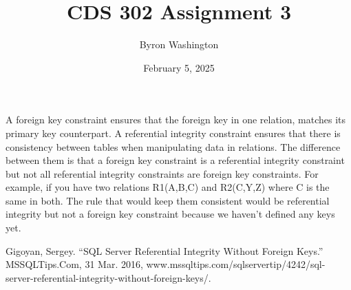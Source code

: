 \documentclass{article}
\title{CDS 302 Assignment 3}
\author{Byron Washington}
\date{February 5, 2025}
\begin{document}
\maketitle
A foreign key constraint ensures that the foreign key in one relation, matches its primary key counterpart. A referential integrity constraint ensures that there is consistency between tables when manipulating data in relations. The difference between them is that a foreign key constraint is a referential integrity constraint but not all referential integrity constraints are foreign key constraints. For example, if you have two relations R1(A,B,C) and R2(C,Y,Z) where C is the same in both. The rule that would keep them consistent would be referential integrity but not a foreign key constraint because we haven't defined any keys yet.\cite{Gigoyan}

\begin{thebibliography}{1}
     Gigoyan, Sergey. “SQL Server Referential Integrity Without Foreign Keys.” MSSQLTips.Com, 31 Mar. 2016, www.mssqltips.com/sqlservertip/4242/sql-server-referential-integrity-without-foreign-keys/. 
\end{thebibliography}
\end{document}
